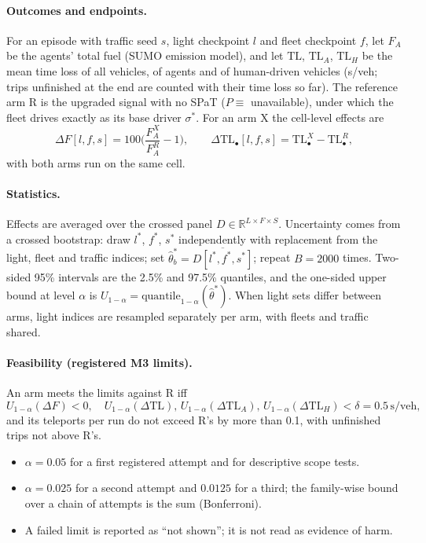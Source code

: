 \documentclass[11pt]{article}
\begin{document}
\paragraph{Outcomes and endpoints.} For an episode with traffic seed $s$, light checkpoint $l$ and fleet checkpoint $f$, let $F_A$ be the
agents' total fuel (SUMO emission model), and let $\mathrm{TL}$, $\mathrm{TL}_A$, $\mathrm{TL}_H$ be the mean time loss of all vehicles,
of agents and of human-driven vehicles (s/veh; trips unfinished at the end are counted with their time loss so far). The reference arm R
is the upgraded signal with no SPaT ($P\equiv$ unavailable), under which the fleet drives exactly as its base driver $\sigma^*$. For an arm
X the cell-level effects are
\begin{equation}
\Delta F[l,f,s] = 100\Big(\frac{F_A^{X}}{F_A^{R}}-1\Big), \qquad \Delta\mathrm{TL}_\bullet[l,f,s]=\mathrm{TL}_\bullet^{X}-\mathrm{TL}_\bullet^{R},
\end{equation}
with both arms run on the same cell.
\paragraph{Statistics.} Effects are averaged over the crossed panel $D\in\mathbb R^{L\times F\times S}$. Uncertainty comes from a crossed
bootstrap: draw $l^*$, $f^*$, $s^*$ independently with replacement from the light, fleet and traffic indices; set
$\hat\theta^*_b=\overline{D[l^*,f^*,s^*]}$; repeat $B=2000$ times. Two-sided 95\% intervals are the 2.5\% and 97.5\% quantiles, and the
one-sided upper bound at level $\alpha$ is $U_{1-\alpha}=\mathrm{quantile}_{1-\alpha}(\hat\theta^*)$. When light sets differ between
arms, light indices are resampled separately per arm, with fleets and traffic shared.
\paragraph{Feasibility (registered M3 limits).} An arm meets the limits against R iff
\begin{equation}
U_{1-\alpha}(\Delta F)<0,\quad U_{1-\alpha}(\Delta\mathrm{TL}),\,U_{1-\alpha}(\Delta\mathrm{TL}_A),\,U_{1-\alpha}(\Delta\mathrm{TL}_H)<\delta=0.5\,\mathrm{s/veh},
\end{equation}
and its teleports per run do not exceed R's by more than 0.1, with unfinished trips not above R's.
\begin{itemize}\setlength\itemsep{0pt}
\item $\alpha=0.05$ for a first registered attempt and for descriptive scope tests.
\item $\alpha=0.025$ for a second attempt and $0.0125$ for a third; the family-wise bound over a chain of attempts is the sum (Bonferroni).
\item A failed limit is reported as ``not shown''; it is not read as evidence of harm.
\end{itemize}
\end{document}
